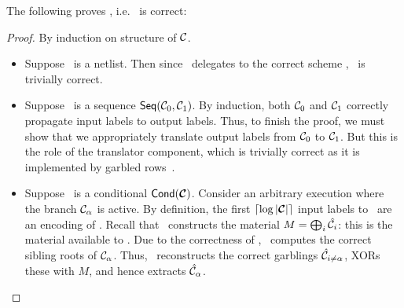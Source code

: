 The following proves , i.e. \ourschemelong\
is correct:
\begin{proof}
  By induction on structure of $\mathcal C$.
  \begin{itemize}
    \item Suppose \cir\ is a netlist. Then since \ourschemelong\ delegates
      to the correct scheme \underscheme, \ourschemelong\ is trivially
      correct.
    \item Suppose \cir\ is a sequence $\textsf{Seq}(\mathcal C_0, \mathcal C_1)$.
      By induction, both $\mathcal C_0$ and $\mathcal C_1$ correctly propagate
      input labels to output labels.
      Thus, to finish the proof, we must show that we appropriately
      translate output labels from $\mathcal C_0$ to $\mathcal C_1$. But this is
      the role of the translator component, which is trivially correct
      as it is implemented by garbled rows~\HK.
    \item Suppose \cir\ is a conditional $\conditional(\vec \cir)$.
      Consider an arbitrary execution where the branch $\mathcal C_{\alpha}$ is
      active.
      By definition, the first $\lceil \log |\vec \cir| \rceil$ input
      labels to \gEv\ are an encoding of \act.
      Recall that \gGb\ constructs the material $M = \bigoplus_i
      \hat{\mathcal C}_i$: this is the material available to \gEv.
      Due to the correctness of \gadget, \gEv\ computes the correct
      sibling roots of $\mathcal C_{\alpha}$. Thus, \evcond\ reconstructs the correct
      garblings $\hat{\mathcal C}_{i \neq \alpha}$, XORs these with $M$, and hence
      extracts $\hat{\mathcal C}_{\alpha}$.


\end{itemize}
\end{proof}
